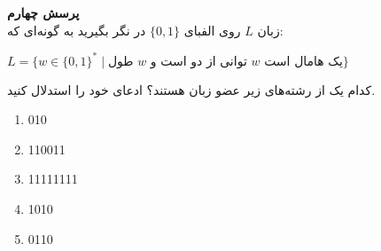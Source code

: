 \textbf{پرسش چهارم}\\[0.1in]
زبان $L$ روی الفبای 
$\{0, 1\}$
در نگر بگیرید به گونه‌ای که:
\begin{center}
    $L = \{ w \in \{0, 1\}^* \; | \; 
    \text{طول $w$ توانی از دو است و $w$ یک هامال است}\}$
\end{center}
کدام یک از رشته‌های زیر عضو زبان هستند؟ ادعای خود را استدلال کنید.
\begin{enumerate}
    \item 010
    \item 110011
    \item 11111111
    \item 1010
    \item 0110
\end{enumerate}